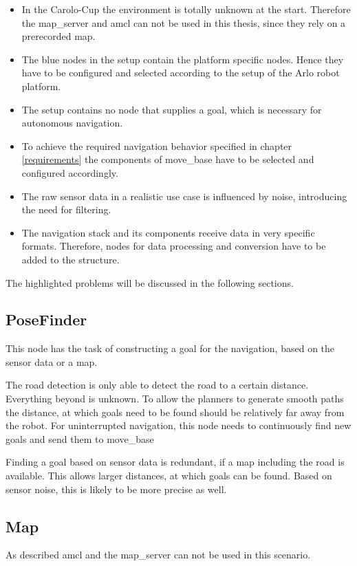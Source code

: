 \begin{itemize}
	\item In the Carolo-Cup the environment is totally unknown at the start. Therefore the map\_server and amcl can not be used in this thesis, since they rely on a prerecorded map.
	\item The blue nodes in the setup contain the platform specific nodes. Hence they have to be configured and selected according to the setup of the Arlo robot platform.
	\item The setup contains no node that supplies a goal, which is necessary for autonomous navigation.
	\item To achieve the required navigation behavior specified in chapter \ref{requirements} the components of move\_base have to be selected and configured accordingly.
	\item The raw sensor data in a realistic use case is influenced by noise, introducing the need for filtering.
	\item The navigation stack and its components receive data in very specific formats. Therefore, nodes for data processing and conversion have to be added to the structure.
\end{itemize}

The highlighted problems will be discussed in the following sections.



\subsection{PoseFinder}

This node has the task of constructing a goal for the navigation, based on the sensor data or a map.

The road detection is only able to detect the road to a certain distance. Everything beyond is unknown. 
To allow the planners to generate smooth paths the distance, at which goals need to be found should be relatively far away from the robot.
For uninterrupted navigation, this node needs to continuously find new goals and send them to move\_base

Finding a goal based on sensor data is redundant, if a map including the road is available. This allows larger distances, at which goals can be found. Based on sensor noise, this is likely to be more precise as well.

\subsection{Map}
As described amcl and the map\_server can not be used in this scenario.

